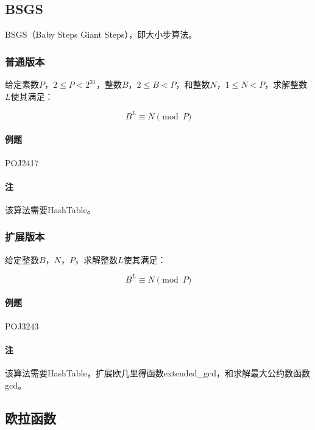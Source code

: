\subsection{BSGS}

BSGS（Baby Steps Giant Steps），即大小步算法。

\subsubsection{普通版本}

给定素数$P$，$2 \leq P < 2^{31}$，整数$B$，$2 \leq B < P$，和整数$N$，$1 \leq N < P$，求解整数$L$使其满足：

\begin{equation}
  B^L \equiv N \pmod P
\end{equation}

\paragraph{例题} POJ2417

\paragraph{注} 该算法需要HashTable。



\subsubsection{扩展版本}

给定整数$B$，$N$，$P$，求解整数$L$使其满足：

\begin{equation}
  B^L \equiv N \pmod P
\end{equation}

\paragraph{例题} POJ3243

\paragraph{注} 该算法需要HashTable，扩展欧几里得函数extended\_gcd，和求解最大公约数函数gcd。



\subsection{欧拉函数}


